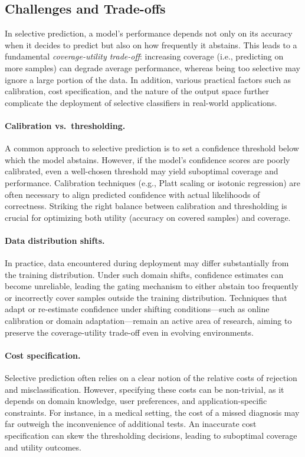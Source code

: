 \subsection{Challenges and Trade-offs}
In selective prediction, a model’s performance depends not only on its accuracy when it decides to predict but also on how frequently it abstains. This leads to a fundamental \emph{coverage-utility trade-off}: increasing coverage (i.e., predicting on more samples) can degrade average performance, whereas being too selective may ignore a large portion of the data. In addition, various practical factors such as calibration, cost specification, and the nature of the output space further complicate the deployment of selective classifiers in real-world applications.

\paragraph{Calibration vs.\ thresholding.}
A common approach to selective prediction is to set a confidence threshold below which the model abstains. However, if the model’s confidence scores are poorly calibrated, even a well-chosen threshold may yield suboptimal coverage and performance. Calibration techniques (e.g., Platt scaling or isotonic regression) are often necessary to align predicted confidence with actual likelihoods of correctness. Striking the right balance between calibration and thresholding is crucial for optimizing both utility (accuracy on covered samples) and coverage.

\paragraph{Data distribution shifts.}
In practice, data encountered during deployment may differ substantially from the training distribution. Under such domain shifts, confidence estimates can become unreliable, leading the gating mechanism to either abstain too frequently or incorrectly cover samples outside the training distribution. Techniques that adapt or re-estimate confidence under shifting conditions—such as online calibration or domain adaptation—remain an active area of research, aiming to preserve the coverage-utility trade-off even in evolving environments.

\paragraph{Cost specification.}
Selective prediction often relies on a clear notion of the relative costs of rejection and misclassification. However, specifying these costs can be non-trivial, as it depends on domain knowledge, user preferences, and application-specific constraints. For instance, in a medical setting, the cost of a missed diagnosis may far outweigh the inconvenience of additional tests. An inaccurate cost specification can skew the thresholding decisions, leading to suboptimal coverage and utility outcomes.


